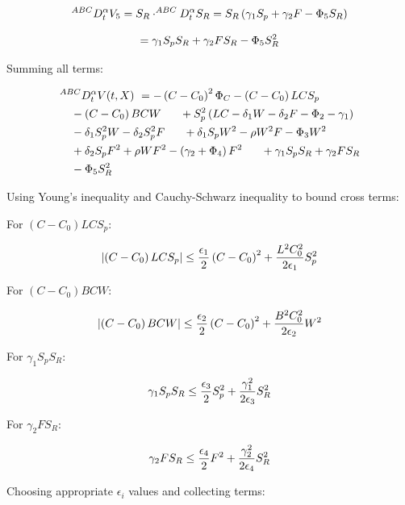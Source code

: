 \documentclass[10pt]{NSP1}
\newcommand{\fitwidth}[1]{\resizebox{\ifdim\width>\linewidth\linewidth\else\width\fi}{!}{#1}}
\begin{document}
\[
\fitwidth{$\displaystyle ^{ABC}D_{t}^{\alpha}V_{5} = S_{R} \cdot^{ABC}D_{t}^{\alpha}S_{R} = S_{R}\left( \gamma_{1}S_{p} + \gamma_{2}F - \Phi_{5}S_{R} \right)$}
\]

\[
\fitwidth{$\displaystyle = \gamma_{1}S_{p}S_{R} + \gamma_{2}FS_{R} - \Phi_{5}S_{R}^{2}$}
\]

Summing all terms:

\[
\fitwidth{$\displaystyle \begin{aligned}
&^{ABC}D_{t}^{\alpha}V(t,X)\  = - \left( C - C_{0} \right)^{2}\Phi_{C} - \left( C - C_{0} \right)LCS_{p} \\
&\quad - \left( C - C_{0} \right)BCW\ \ \quad + S_{p}^{2}\left( LC - \delta_{1}W - \delta_{2}F - \Phi_{2} - \gamma_{1} \right) \\
&\quad - \delta_{1}S_{p}^{2}W - \delta_{2}S_{p}^{2}F\ \ \quad + \delta_{1}S_{p}W^{2} - \rho W^{2}F - \Phi_{3}W^{2}\ \ \quad \\
&\quad + \delta_{2}S_{p}F^{2} + \rho WF^{2} - \left( \gamma_{2} + \Phi_{4} \right)F^{2}\ \ \quad + \gamma_{1}S_{p}S_{R} + \gamma_{2}FS_{R} \\
&\quad - \Phi_{5}S_{R}^{2}{}
\end{aligned}$}
\]

Using Young's inequality and Cauchy-Schwarz inequality to bound cross terms:

For \(\left( C - C_{0} \right)LCS_{p}\):

\[
\fitwidth{$\displaystyle \left| \left( C - C_{0} \right)LCS_{p} \right| \leq \frac{\epsilon_{1}}{2}\left( C - C_{0} \right)^{2} + \frac{L^{2}C_{0}^{2}}{2\epsilon_{1}}S_{p}^{2}$}
\]

For \(\left( C - C_{0} \right)BCW\):

\[
\fitwidth{$\displaystyle \left| \left( C - C_{0} \right)BCW \right| \leq \frac{\epsilon_{2}}{2}\left( C - C_{0} \right)^{2} + \frac{B^{2}C_{0}^{2}}{2\epsilon_{2}}W^{2}$}
\]

For \(\gamma_{1}S_{p}S_{R}\):

\[
\fitwidth{$\displaystyle \gamma_{1}S_{p}S_{R} \leq \frac{\epsilon_{3}}{2}S_{p}^{2} + \frac{\gamma_{1}^{2}}{2\epsilon_{3}}S_{R}^{2}$}
\]

For \(\gamma_{2}FS_{R}\):

\[
\fitwidth{$\displaystyle \gamma_{2}FS_{R} \leq \frac{\epsilon_{4}}{2}F^{2} + \frac{\gamma_{2}^{2}}{2\epsilon_{4}}S_{R}^{2}$}
\]

Choosing appropriate \(\epsilon_{i}\) values and collecting terms:
\end{document}
